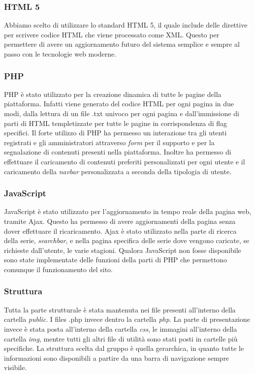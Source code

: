 \subsubsection{HTML 5}
Abbiamo scelto di utilizzare lo standard HTML 5, il quale include delle direttive per scrivere codice HTML che viene processato come XML. Questo per permettere di avere un aggiornamento futuro del sistema  semplice e sempre al passo con le tecnologie web moderne.

\subsubsection{PHP}
PHP è stato utilizzato per la creazione dinamica di tutte le pagine della piattaforma. Infatti viene generato del codice HTML per ogni pagina in due modi, dalla lettura di un file .txt univoco per ogni pagina e dall'immissione di parti di HTML templetizzate per tutte le pagine in corrispondenza di flag specifici. Il forte utilizzo di PHP ha permesso un interazione tra gli utenti registrati e gli amministratori attraverso \textit{form} per il supporto e per la segnalazione di contenuti presenti nella piattaforma. Inoltre ha permesso di effettuare il caricamento di contenuti preferiti personalizzati per ogni utente e il caricamento della \textit{navbar} personalizzata a seconda della tipologia di utente. 

\subsubsection{JavaScript}
JavaScript è stato utilizzato per l'aggiornamento in tempo reale della pagina web, tramite Ajax. Questo ha permesso di avere aggiornamenti della pagina senza dover effettuare il ricaricamento. Ajax è stato utilizzato nella parte di ricerca della serie, \textit{searchbar}, e nella pagina specifica delle serie dove vengono caricate, se richieste dall'utente, le varie stagioni. Qualora JavaScript non fosse disponibile sono state implementate delle funzioni della parti di PHP che permettono comunque il funzionamento del sito.

\subsubsection{Struttura}
Tutta la parte strutturale è stata mantenuta nei file presenti all'interno della cartella \textit{public}. I files .php invece dentro la cartella \textit{php}. La parte di presentazione invece è stata posta all'interno della cartella \textit{css}, le immagini all'interno della cartella \textit{img}, mentre tutti gli altri file di utilità sono stati posti in cartelle più specifiche. La struttura scelta dal gruppo è quella gerarchica, in quanto tutte le informazioni sono disponibili a partire da una barra di navigazione sempre visibile.

